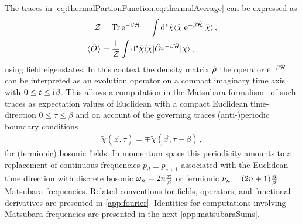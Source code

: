 The traces in \cref{eq:thermalPartionFunction,eq:thermalAverage} can be expressed as
\begin{align}
	\thermalPartionFunction&=\Tr\eu^{-\beta \thermalHamiltonian}=\int \dif^{\,s}\!\tilde{\chi} \langle\tilde{\chi}|\eu^{-\beta \thermalHamiltonian}|\tilde{\chi}\rangle\, ,\label{eq:thermalPhiTrace}\\ 
	\langle\mkern1mu\hat{O}\mkern1mu\rangle &= \frac{1}{\thermalPartionFunction}\int \dif^{\,s}\!\tilde{\chi} \langle\tilde{\chi}|\hat{O}\eu^{-\beta \thermalHamiltonian}|\tilde{\chi}\rangle\, ,
\end{align}
using field eigenstates.
In this context the density matrix $\hat{\rho}$ \dash{} the operator $\mathrm{e}^{-\beta \hat{\mathcal{H}}}$ \dash{} can be interpreted as an evolution operator on a compact imaginary time axis with $0\le t \le \mathrm{i}\mkern1mu \beta$.
This allows a computation \dash{} in the Matsubara formalism~\cite{Matsubara:1955ws} \dash{} of such traces as expectation values of Euclidean \qfts{} with a compact Euclidean time-direction $0\le\tau\le\beta$ and on account of the governing traces (anti-)periodic boundary conditions
\begin{align}
	\tilde{\chi}(\vec{x},\tau)=\mp\tilde{\chi}(\vec{x},\tau+\beta)\, ,
	\label{eq:thermalBCs}
\end{align}
for (fermionic) bosonic fields.
In momentum space this periodicity amounts to a replacement of continuous frequencies $p_{d}\equiv p_{s+1}$ associated with the Euclidean time direction with discrete bosonic $\omega_n = 2n \tfrac{\mkern1.0mu\uppi\mkern1.0mu}{\beta}$ or fermionic $\nu_n=(2n+1)\tfrac{\mkern1.0mu\uppi\mkern1.0mu}{\beta}$ Matsubara frequencies.
Related conventions for fields, operators, and functional derivatives are presented in \cref{app:fourier}.
Identities for computations involving Matsubara frequencies are presented in the next \cref{app:matsubaraSums}.

